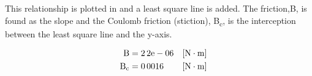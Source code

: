 This relationship is plotted in  and a least square line is added. The friction,\si{B}, is found as the slope and the Coulomb friction (stiction), \si{B_c}, is the interception between the least square line and the y-axis.

\begin{align}
  \eq{B}{2.2e-06} \unit{N\cdot m}\nonumber\\
  \eq{B_c}{0.0016} \unit{N\cdot m}\nonumber
\end{align}